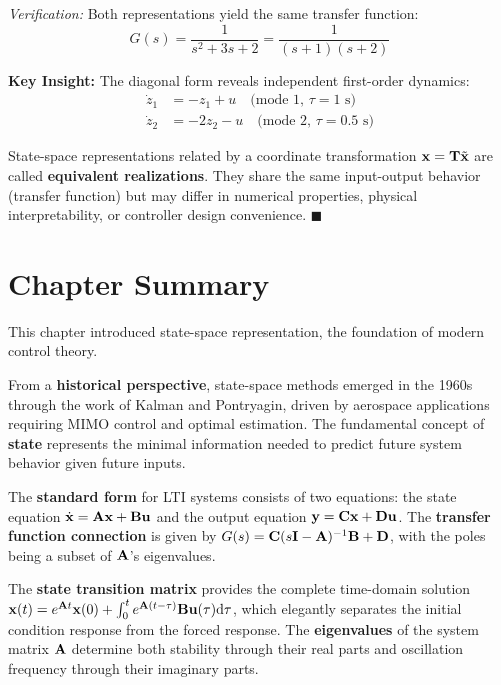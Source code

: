 \textit{Verification:} Both representations yield the same transfer function:
\begin{equation}
    G(s) = \frac{1}{s^2+3s+2} = \frac{1}{(s+1)(s+2)}
\end{equation}

\textbf{Key Insight:} The diagonal form reveals independent first-order dynamics:
\begin{align}
    \dot{z}_1 &= -z_1 + u \quad \text{(mode 1, $\tau = 1$ s)} \\
    \dot{z}_2 &= -2z_2 - u \quad \text{(mode 2, $\tau = 0.5$ s)}
\end{align}

State-space representations related by a coordinate transformation $\mathbf{x} = \mathbf{T}\tilde{\mathbf{x}}$ are called \textbf{equivalent realizations}. They share the same input-output behavior (transfer function) but may differ in numerical properties, physical interpretability, or controller design convenience. \hfill $\blacksquare$

\section{Chapter Summary}

This chapter introduced state-space representation, the foundation of modern control theory.

From a \textbf{historical perspective}, state-space methods emerged in the 1960s through the work of Kalman and Pontryagin, driven by aerospace applications requiring MIMO control and optimal estimation. The fundamental concept of \textbf{state} represents the minimal information needed to predict future system behavior given future inputs.

The \textbf{standard form} for LTI systems consists of two equations: the state equation $\dot{\mathbf{x}} = \mathbf{A}\mathbf{x} + \mathbf{B}\mathbf{u}$ and the output equation $\mathbf{y} = \mathbf{C}\mathbf{x} + \mathbf{D}\mathbf{u}$. The \textbf{transfer function connection} is given by $G(s) = \mathbf{C}(s\mathbf{I}-\mathbf{A})^{-1}\mathbf{B} + \mathbf{D}$, with the poles being a subset of $\mathbf{A}$'s eigenvalues.

The \textbf{state transition matrix} provides the complete time-domain solution $\mathbf{x}(t) = e^{\mathbf{A}t}\mathbf{x}(0) + \int_0^t e^{\mathbf{A}(t-\tau)}\mathbf{B}\mathbf{u}(\tau)\mathrm{d}\tau$, which elegantly separates the initial condition response from the forced response. The \textbf{eigenvalues} of the system matrix $\mathbf{A}$ determine both stability through their real parts and oscillation frequency through their imaginary parts.

